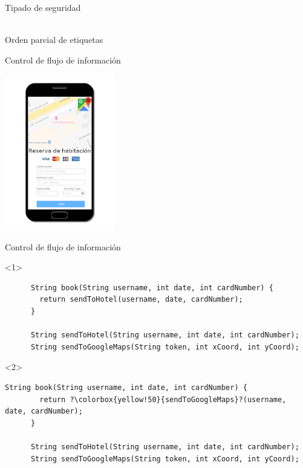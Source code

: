 \documentclass[aspectratio=169,18pt]{beamer}
\begin{document}
\begin{frame}[fragile]{Tipado de seguridad}
	\begin{center}
		\ \\
		\vspace{1cm}
		Orden parcial de etiquetas
	\end{center}

\end{frame}

\begin{frame}[fragile]{Control de flujo de información}
	\begin{center}
		\includegraphics[width=0.36\textwidth]{images/book.png}
	\end{center}
\end{frame}

\begin{frame}[fragile]{Control de flujo de información}
  \begin{onlyenv}<1>
    \begin{lstlisting}
      String book(String username, int date, int cardNumber) {
        return sendToHotel(username, date, cardNumber);
      }

      String sendToHotel(String username, int date, int cardNumber);
      String sendToGoogleMaps(String token, int xCoord, int yCoord);
    \end{lstlisting}
  \end{onlyenv}
  \begin{onlyenv}<2>
    \begin{lstlisting}[escapechar=?]
      String book(String username, int date, int cardNumber) {
        return ?\colorbox{yellow!50}{sendToGoogleMaps}?(username, date, cardNumber);
      }

      String sendToHotel(String username, int date, int cardNumber);
      String sendToGoogleMaps(String token, int xCoord, int yCoord);
    \end{lstlisting}
  \end{onlyenv}

\end{frame}
\end{document}
